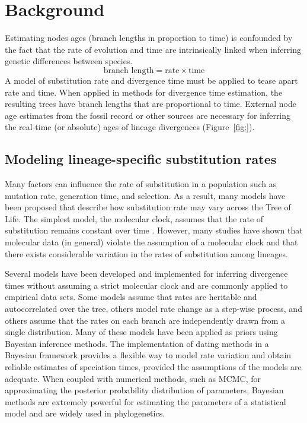 \section{Background}

Estimating nodes ages (\IE branch lengths in proportion to time) is confounded by the fact that the rate of evolution and time are intrinsically linked when inferring genetic differences between species. 
\begin{equation}
\text{branch length} = \text{rate} \times \text{time}
\end{equation}
A model of substitution rate and divergence time must be applied to tease apart rate and time. 
When applied in methods for divergence time estimation, the resulting trees have branch lengths that are proportional to time. 
External node age estimates from the fossil record or other sources are necessary for inferring the real-time (or
absolute) ages of lineage divergences (Figure~\ref{fig:}).


\subsection{Modeling lineage-specific substitution rates}

Many factors can influence the rate of substitution in a population such as mutation rate, generation time, and selection. 
As a result, many models have been proposed that describe how substitution rate may vary across the Tree of Life.
The simplest model, the molecular clock, assumes that the rate of substitution remains constant over time \citep{Zuckerkandl1962}.
However, many studies have shown that molecular data (in general) violate the assumption of a molecular clock and that there exists considerable variation in the rates of substitution among lineages.

Several models have been developed and implemented for inferring divergence times without assuming a strict molecular clock and are commonly applied to empirical data sets. 
Some models assume that rates are heritable and autocorrelated over the tree, others model rate change as a step-wise process, and others assume that the rates on each branch are independently drawn from a single distribution. 
Many of these models have been applied as priors using Bayesian inference methods. 
The implementation of dating methods in a Bayesian framework provides a flexible way to model rate variation and obtain reliable estimates of speciation times, provided the assumptions of the models are adequate. 
When coupled with numerical methods, such as MCMC, for approximating the posterior probability distribution of parameters, Bayesian methods are extremely powerful for estimating the parameters of a statistical model and are widely used in phylogenetics.


